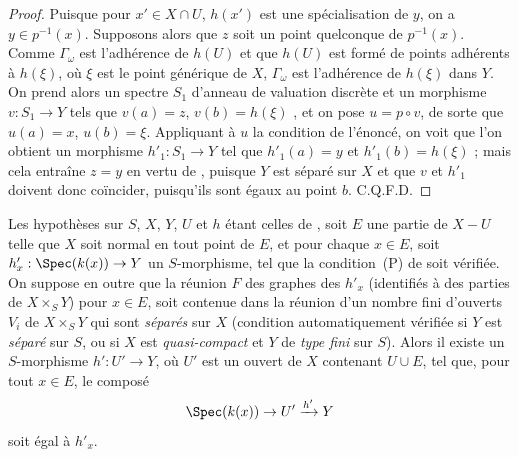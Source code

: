\begin{proof}
Puisque pour $x'\in X\cap U$, $h(x')$ est une spécialisation de $y$, on a $y\in p^{-1}(x)$.
Supposons alors que $z$ soit un point quelconque de $p^{-1}(x)$.
Comme $\Gamma_\omega$ est l'adhérence de $h(U)$ et que $h(U)$ est formé de points adhérents à $h(\xi)$, où $\xi$ est le point générique de $X$, $\Gamma_\omega$ est l'adhérence de $h(\xi)$ dans $Y$.
On prend alors un spectre $S_1$ d'anneau de valuation discrète et un morphisme $v:S_1\to Y$ tels que $v(a)=z$, $v(b)=h(\xi)$ , et on pose $u=p\circ v$, de sorte que $u(a)=x$, $u(b)=\xi$.
Appliquant à $u$ la condition de l'énoncé, on voit que l'on obtient un morphisme $h'_1:S_1\to Y$ tel que $h'_1(a)=y$ et $h'_1(b)=h(\xi)$ ; mais cela entraîne $z=y$ en vertu de , puisque $Y$ est séparé sur $X$ et que $v$ et $h'_1$ doivent donc coïncider, puisqu'ils sont égaux au point $b$.
C.Q.F.D.
\end{proof}

\begin{corollary}[20.4.7]
Les hypothèses sur $S$, $X$, $Y$, $U$ et $h$ étant celles de , soit $E$ une partie de $X-U$ telle que $X$ soit normal en tout point de $E$, et pour chaque $x\in E$, soit $h'_x:\Spec(k(x))\to Y$ un $S$-morphisme, tel que la condition~(P) de  soit vérifiée.
On suppose en outre que la réunion $F$ des graphes des $h'_x$ (identifiés à des parties de $X\times_S Y$) pour $x\in E$, soit contenue dans la réunion d'un nombre fini d'ouverts $V_i$ de $X\times_S Y$ qui sont \emph{séparés} sur $X$ (condition automatiquement vérifiée si $Y$ est \emph{séparé} sur $S$, ou si $X$ est \emph{quasi-compact} et $Y$ de \emph{type fini} sur $S$).
Alors il existe un $S$-morphisme $h':U'\to Y$, où $U'$ est un ouvert de $X$ contenant $U\cup E$, tel que, pour tout $x\in E$, le composé
\[
  \Spec(k(x))\to U'\xrightarrow{h'}Y
\]
soit égal à $h'_x$.
\end{corollary}

